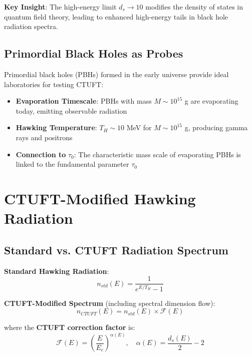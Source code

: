 \textbf{Key Insight}: The high-energy limit $d_s \to 10$ modifies the density of states in quantum field theory, leading to enhanced high-energy tails in black hole radiation spectra.

\subsection{Primordial Black Holes as Probes}
\label{subsec:pbh-probes}

Primordial black holes (PBHs) formed in the early universe provide ideal laboratories for testing CTUFT:

\begin{itemize}
    \item \textbf{Evaporation Timescale}: PBHs with mass $M \sim 10^{15}$ g are evaporating today, emitting observable radiation
    \item \textbf{Hawking Temperature}: $T_H \sim 10$ MeV for $M \sim 10^{15}$ g, producing gamma rays and positrons
    \item \textbf{Connection to }$\tau_0$: The characteristic mass scale of evaporating PBHs is linked to the fundamental parameter $\tau_0$
\end{itemize}

\section{CTUFT-Modified Hawking Radiation}
\label{sec:modified-hawking}

\subsection{Standard vs. CTUFT Radiation Spectrum}
\label{subsec:spectrum-comparison}

\textbf{Standard Hawking Radiation}:
\begin{equation}
n_{std}(E) = \frac{1}{e^{E/T_H} - 1}
\label{eq:standard-hawking}
\end{equation}

\textbf{CTUFT-Modified Spectrum} (including spectral dimension flow):
\begin{equation}
n_{CTUFT}(E) = n_{std}(E) \times \mathcal{F}(E)
\label{eq:ctuft-hawking}
\end{equation}

where the \textbf{CTUFT correction factor} is:
\begin{equation}
\mathcal{F}(E) = \left(\frac{E}{E_c}\right)^{\alpha(E)}, \quad \alpha(E) = \frac{d_s(E)}{2} - 2
\label{eq:correction-factor}
\end{equation}

